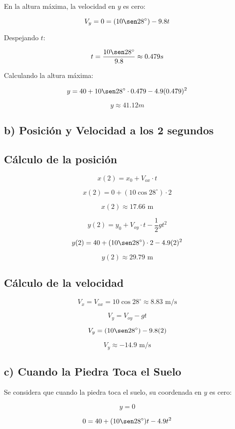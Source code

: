 En la altura máxima, la velocidad en $y$ es cero:

\[
V_y = 0 = (10 \sen 28^\circ) - 9.8t
\]

Despejando $t$:

\[
t = \frac{10 \sen 28^\circ}{9.8} \approx 0.479s
\]

Calculando la altura máxima:

\[
y = 40 + 10 \sen 28^\circ \cdot 0.479 - 4.9 (0.479)^2
\]

\[
y \approx 41.12m
\]

\subsection*{b) Posición y Velocidad a los 2 segundos}

\subsection*{Cálculo de la posición}

\[
x(2) = x_0 + V_{ox} \cdot t
\]

\[
x(2) = 0 + (10 \cos 28^\circ) \cdot 2
\]

\[
x(2) \approx 17.66 \text{ m}
\]

\[
y(2) = y_0 + V_{oy} \cdot t - \frac{1}{2} g t^2
\]

\[
y(2) = 40 + (10 \sen 28^\circ) \cdot 2 - 4.9 (2)^2
\]

\[
y(2) \approx 29.79 \text{ m}
\]

\subsection*{Cálculo de la velocidad}

\[
V_x = V_{ox} = 10 \cos 28^\circ \approx 8.83 \text{ m/s}
\]

\[
V_y = V_{oy} - g t
\]

\[
V_y = (10 \sen 28^\circ) - 9.8 (2)
\]

\[
V_y \approx -14.9 \text{ m/s}
\]

\subsection{c) Cuando la Piedra Toca el Suelo}

Se considera que cuando la piedra toca el suelo, su coordenada en $y$ es cero:

\[
y = 0
\]

\[
0 = 40 + (10 \sen 28^\circ) t - 4.9 t^2
\]

